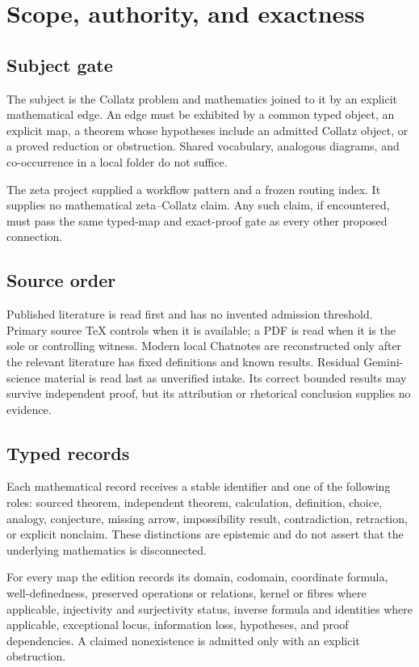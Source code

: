 \section{Scope, authority, and exactness}

\subsection{Subject gate}

The subject is the Collatz problem and mathematics joined to it by an explicit
mathematical edge.  An edge must be exhibited by a common typed object, an
explicit map, a theorem whose hypotheses include an admitted Collatz object,
or a proved reduction or obstruction.  Shared vocabulary, analogous diagrams,
and co-occurrence in a local folder do not suffice.

The zeta project supplied a workflow pattern and a frozen routing index.  It
supplies no mathematical zeta--Collatz claim.  Any such claim, if encountered,
must pass the same typed-map and exact-proof gate as every other proposed
connection.

\subsection{Source order}

Published literature is read first and has no invented admission threshold.
Primary source \TeX{} controls when it is available; a PDF is read when it is
the sole or controlling witness.  Modern local Chatnotes are reconstructed
only after the relevant literature has fixed definitions and known results.
Residual Gemini-science material is read last as unverified intake.  Its
correct bounded results may survive independent proof, but its attribution or
rhetorical conclusion supplies no evidence.

\subsection{Typed records}

Each mathematical record receives a stable identifier and one of the following
roles: sourced theorem, independent theorem, calculation, definition, choice,
analogy, conjecture, missing arrow, impossibility result, contradiction,
retraction, or explicit nonclaim.  These distinctions are epistemic and do not
assert that the underlying mathematics is disconnected.

For every map the edition records its domain, codomain, coordinate formula,
well-definedness, preserved operations or relations, kernel or fibres where
applicable, injectivity and surjectivity status, inverse formula and identities
where applicable, exceptional locus, information loss, hypotheses, and proof
dependencies.  A claimed nonexistence is admitted only with an explicit
obstruction.

